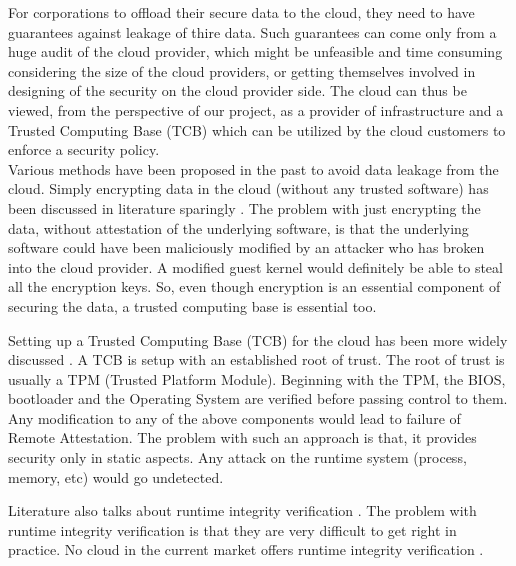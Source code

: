 \documentclass[10pt,twocolumn,pdftex]{article}
\begin{document}
For corporations to offload their secure data to the cloud, they need to have guarantees against leakage of thire data. Such guarantees can come only from a huge audit of the cloud provider, which might be unfeasible and time consuming considering the size of the cloud providers, or getting themselves involved in designing of the security on the cloud provider side. The cloud can thus be viewed, from the perspective of our project, as a provider of infrastructure and a Trusted Computing Base (TCB) which can be utilized by the cloud customers to enforce a security policy. \\

Various methods have been proposed in the past to avoid data leakage from the cloud. Simply encrypting data in the cloud (without any trusted software) has been discussed in literature sparingly \cite{cryptographic-cloud-storage, towards-secure-cloud-storage}. The problem with just encrypting the data, without attestation of the underlying software, is that the underlying software could have been maliciously modified by an attacker who has broken into the cloud provider. A modified guest kernel would definitely be able to steal all the encryption keys. So, even though encryption is an essential component of securing the data, a trusted computing base is essential too.

Setting up a Trusted Computing Base (TCB) for the cloud has been more widely discussed \cite{towards-trusted-cloud-computing, seeding-clouds-with-trust-anchors, terra, semantic-remote}. A TCB is setup with an established root of trust. The root of trust is usually a TPM (Trusted Platform Module). Beginning with the TPM, the BIOS, bootloader and the Operating System are verified before passing control to them. Any modification to any of the above components would lead to failure of Remote Attestation. The problem with such an approach is that, it provides security only in static aspects. Any attack on the runtime system (process, memory, etc) would go undetected. 

Literature also talks about runtime integrity verification \cite{integrity-1, integrity-2, integrity-3, integrity-4}. The problem with runtime integrity verification is that they are very difficult to get right in practice. No cloud in the current market offers runtime integrity verification \cite{seeding-clouds-with-trust-anchors}.
\end{document}
